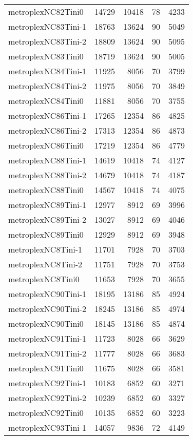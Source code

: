 \begin{tabular}{lrrrr}
metroplexNC82Tini0 & 14729 & 10418 & 78 & 4233 \\
metroplexNC83Tini-1 & 18763 & 13624 & 90 & 5049 \\
metroplexNC83Tini-2 & 18809 & 13624 & 90 & 5095 \\
metroplexNC83Tini0 & 18719 & 13624 & 90 & 5005 \\
metroplexNC84Tini-1 & 11925 & 8056 & 70 & 3799 \\
metroplexNC84Tini-2 & 11975 & 8056 & 70 & 3849 \\
metroplexNC84Tini0 & 11881 & 8056 & 70 & 3755 \\
metroplexNC86Tini-1 & 17265 & 12354 & 86 & 4825 \\
metroplexNC86Tini-2 & 17313 & 12354 & 86 & 4873 \\
metroplexNC86Tini0 & 17219 & 12354 & 86 & 4779 \\
metroplexNC88Tini-1 & 14619 & 10418 & 74 & 4127 \\
metroplexNC88Tini-2 & 14679 & 10418 & 74 & 4187 \\
metroplexNC88Tini0 & 14567 & 10418 & 74 & 4075 \\
metroplexNC89Tini-1 & 12977 & 8912 & 69 & 3996 \\
metroplexNC89Tini-2 & 13027 & 8912 & 69 & 4046 \\
metroplexNC89Tini0 & 12929 & 8912 & 69 & 3948 \\
metroplexNC8Tini-1 & 11701 & 7928 & 70 & 3703 \\
metroplexNC8Tini-2 & 11751 & 7928 & 70 & 3753 \\
metroplexNC8Tini0 & 11653 & 7928 & 70 & 3655 \\
metroplexNC90Tini-1 & 18195 & 13186 & 85 & 4924 \\
metroplexNC90Tini-2 & 18245 & 13186 & 85 & 4974 \\
metroplexNC90Tini0 & 18145 & 13186 & 85 & 4874 \\
metroplexNC91Tini-1 & 11723 & 8028 & 66 & 3629 \\
metroplexNC91Tini-2 & 11777 & 8028 & 66 & 3683 \\
metroplexNC91Tini0 & 11675 & 8028 & 66 & 3581 \\
metroplexNC92Tini-1 & 10183 & 6852 & 60 & 3271 \\
metroplexNC92Tini-2 & 10239 & 6852 & 60 & 3327 \\
metroplexNC92Tini0 & 10135 & 6852 & 60 & 3223 \\
metroplexNC93Tini-1 & 14057 & 9836 & 72 & 4149 \\

\end{tabular}
